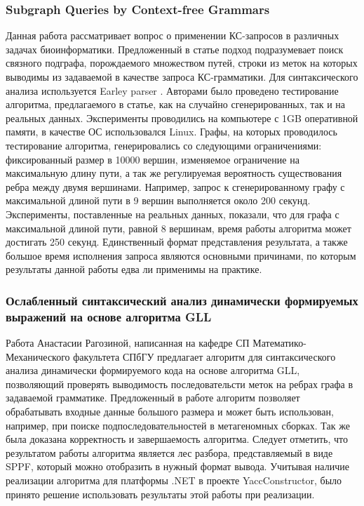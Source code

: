 \documentclass[14pt]{matmex-diploma-custom}
\begin{document}
		\subsubsection*{Subgraph Queries by Context-free Grammars}
		Данная работа рассматривает вопрос о применении КС-запросов в различных задачах биоинформатики. Предложенный в статье подход подразумевает поиск связного подграфа, порождаемого множеством путей, строки из меток на которых выводимы из задаваемой в качестве запроса КС-грамматики. Для синтаксического анализа используется Earley parser \cite{hale2001probabilistic}. Авторами было проведено тестирование алгоритма, предлагаемого в статье, как на случайно сгенерированных, так и на реальных данных. Эксперименты проводились на компьютере с 1GB оперативной памяти, в качестве ОС использовался Linux. Графы, на которых проводилось тестирование алгоритма, генерировались со следующими ограничениями: фиксированный размер в 10000 вершин, изменяемое ограничение на максимальную длину пути, а так же регулируемая вероятность существования ребра между двумя вершинами. Например, запрос к сгенерированному графу с максимальной длиной пути в 9 вершин выполняется около 200 секунд. Эксперименты, поставленные на реальных данных, показали, что для графа с максимальной длиной пути, равной 8 вершинам, время работы алгоритма может достигать 250 секунд. Единственный формат представления результата, а также большое время исполнения запроса являются основными причинами, по которым результаты данной работы едва ли применимы на практике.
		\subsubsection*{Ослабленный синтаксический анализ динамически формируемых выражений на основе алгоритма GLL}
		Работа Анастасии Рагозиной, написанная на кафедре СП Математико-Механического факультета СПбГУ предлагает алгоритм для синтаксического анализа динамически формируемого кода на основе алгоритма GLL, позволяющий проверять выводимость последовательсти меток на ребрах графа в задаваемой грамматике. Предложенный в работе алгоритм позволяет обрабатывать входные данные большого размера и может быть использован, например, при поиске подпоследовательностей в метагеномных сборках. Так же была доказана корректность и завершаемость алгоритма. Следует отметить, что результатом работы алгоритма является лес разбора, представляемый в виде SPPF\cite{SPPF}, который можно отобразить в нужный формат вывода. Учитывая наличие реализации алгоритма для платформы .NET в проекте YaccConstructor, было принято решение использовать результаты этой работы при реализации.
\end{document}
